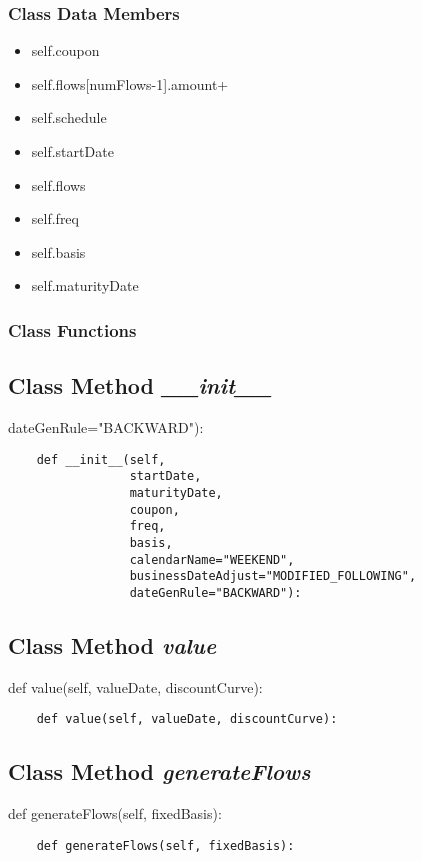 \documentclass[twoside,11pt]{book}
\begin{document}
\subsubsection{Class Data Members}
\begin{itemize}
\item{self.coupon}
\item{self.flows[numFlows-1].amount+}
\item{self.schedule}
\item{self.startDate}
\item{self.flows}
\item{self.freq}
\item{self.basis}
\item{self.maturityDate}
\end{itemize}

\subsubsection{Class Functions}

\subsection{Class Method {\it \_\_init\_\_}}
dateGenRule="BACKWARD"):

\begin{lstlisting}
    def __init__(self,
                 startDate,
                 maturityDate,
                 coupon,
                 freq,
                 basis,
                 calendarName="WEEKEND",
                 businessDateAdjust="MODIFIED_FOLLOWING",
                 dateGenRule="BACKWARD"):
\end{lstlisting}

\subsection{Class Method {\it value}}
def value(self, valueDate, discountCurve):

\begin{lstlisting}
    def value(self, valueDate, discountCurve):
\end{lstlisting}

\subsection{Class Method {\it generateFlows}}
def generateFlows(self, fixedBasis):

\begin{lstlisting}
    def generateFlows(self, fixedBasis):
\end{lstlisting}
\end{document}
